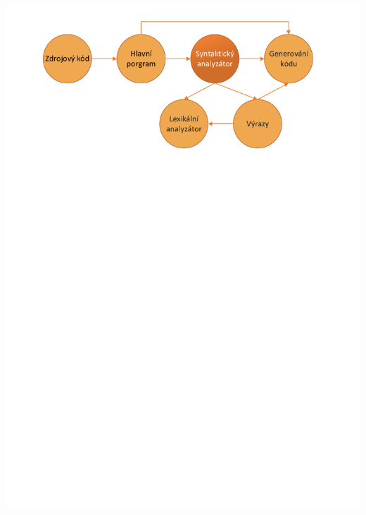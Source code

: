 \documentclass[11pt, hyperref={unicode}]{beamer}
\begin{document}
\begin{frame}
\begin{overprint}
 	\centerline{\includegraphics[width=0.95\linewidth]{img/parser.pdf}}%

\end{overprint}
\end{frame}
\end{document}
